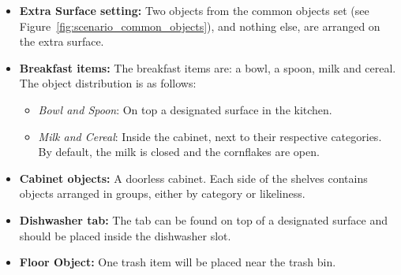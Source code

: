 \begin{itemize}[nosep]
\begin{itemize}
\begin{itemize}[nosep]
				\item \textit{Other objects}: Two known objects not belonging to the above categories.
			\end{itemize}
			\item \textbf{Extra Surface setting:} Two objects from the common objects set (see Figure~\ref{fig:scenario_common_objects}), and nothing else, are arranged on the extra surface.
			\item \textbf{Breakfast items:} The breakfast items are: a bowl, a spoon, milk and cereal. 
			The object distribution is as follows:
			\begin{itemize}[nosep]
				\item\textit{Bowl and Spoon}: On top a designated surface in the kitchen.
				\item\textit{Milk and Cereal}: Inside the cabinet, next to their respective categories. By default, the milk is closed and the cornflakes are open.
			\end{itemize}
			\item \textbf{Cabinet objects:} A doorless cabinet. Each side of the shelves contains objects arranged in groups, either by category or likeliness.
			\item \textbf{Dishwasher tab:} The tab can be found on top of a designated surface and should be placed inside the dishwasher slot.
			\item \textbf{Floor Object:} One trash item will be placed near the trash bin.
		\end{itemize}
\end{itemize}



